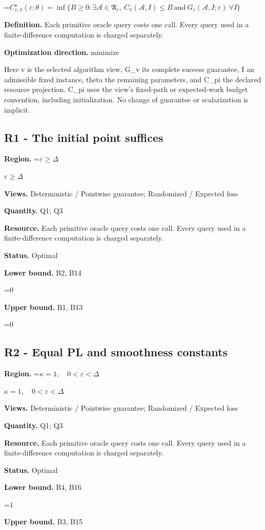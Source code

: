 \documentclass[10pt,a4paper]{article}
\newcommand{\AtlasMath}[1]{\par\begingroup\centering\setbox0=\hbox{$\displaystyle #1$}\ifdim\wd0>1.4\linewidth\typeout{ATLAS WIDE FORMULA: \the\wd0}\fi\ifdim\wd0>\linewidth\resizebox{\linewidth}{!}{\box0}\else\box0\fi\par\endgroup}
\newcommand{\AtlasInlineMath}[1]{\begingroup\setbox0=\hbox{$#1$}\ifdim\wd0>.4\linewidth\endgroup\AtlasMath{#1}\else\endgroup$#1$\fi}
\begin{document}
\AtlasMath{C^\star_{v,\pi}(\varepsilon;\theta)=\inf\{B\ge0:\exists\mathcal A\in\mathfrak A_v,\ C_\pi(\mathcal A,I)\le B\ \text{and}\ G_v(\mathcal A,I;\varepsilon)\ \forall I\}}
\textbf{Definition.} Each primitive oracle query costs one call. Every query used in a finite-difference computation is charged separately.

\textbf{Optimization direction.} minimize

Here v is the selected algorithm view, G\_v its complete success guarantee, I an admissible fixed instance, theta the remaining parameters, and C\_pi the declared resource projection. C\_pi uses the view's fixed-path or expected-work budget convention, including initialization. No change of guarantee or scalarization is implicit.

\subsection{R1 - The initial point suffices}
\textbf{Region.} \AtlasInlineMath{\varepsilon\ge\Delta}

\textbf{Views.} Deterministic / Pointwise guarantee; Randomized / Expected loss

\textbf{Quantity.} Q1; Q3

\textbf{Resource.} Each primitive oracle query costs one call. Every query used in a finite-difference computation is charged separately.

\textbf{Status.} Optimal

\textbf{Lower bound.} B2, B14

\AtlasMath{0}
\textbf{Upper bound.} B1, B13

\AtlasMath{0}
\subsection{R2 - Equal PL and smoothness constants}
\textbf{Region.} \AtlasInlineMath{\kappa=1,\quad0<\varepsilon<\Delta}

\textbf{Views.} Deterministic / Pointwise guarantee; Randomized / Expected loss

\textbf{Quantity.} Q1; Q3

\textbf{Resource.} Each primitive oracle query costs one call. Every query used in a finite-difference computation is charged separately.

\textbf{Status.} Optimal

\textbf{Lower bound.} B4, B16

\AtlasMath{1}
\textbf{Upper bound.} B3, B15
\end{document}
